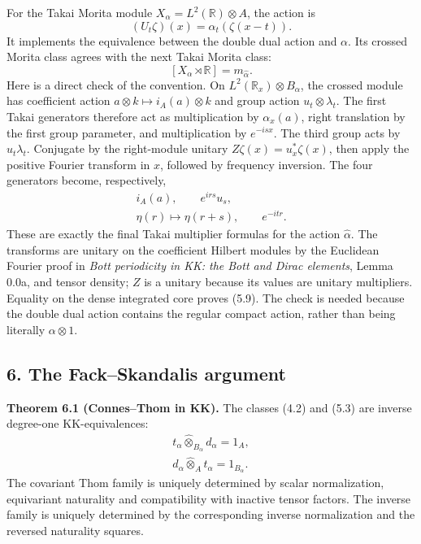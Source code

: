 \documentclass[
  11pt,
]{article}
\begin{document}
For the Takai Morita module \(X_\alpha=L^2(\mathbb R)\otimes A\), the
action is \[
(U_t\zeta)(x)=\alpha_t(\zeta(x-t)).
\tag{5.8}
\] It implements the equivalence between the double dual action and
\(\alpha\). Its crossed Morita class agrees with the next Takai Morita
class: \[
[X_\alpha\rtimes\mathbb R]=m_{\widehat\alpha}.
\tag{5.9}
\] Here is a direct check of the convention. On
\(L^2(\mathbb R_x)\otimes B_\alpha\), the crossed module has coefficient
action \(a\otimes k\mapsto i_A(a)\otimes k\) and group action
\(u_t\otimes\lambda_t\). The first Takai generators therefore act as
multiplication by \(\alpha_x(a)\), right translation by the first group
parameter, and multiplication by \(e^{-isx}\). The third group acts by
\(u_t\lambda_t\). Conjugate by the right-module unitary
\(Z\zeta(x)=u_x^*\zeta(x)\), then apply the positive Fourier transform
in \(x\), followed by frequency inversion. The four generators become,
respectively, \[
\begin{gathered}
i_A(a),\qquad e^{irs}u_s,\\
\eta(r)\longmapsto\eta(r+s),\qquad e^{-itr}.
\end{gathered}
\tag{5.10}
\] These are exactly the final Takai multiplier formulas for the action
\(\widehat\alpha\). The transforms are unitary on the coefficient
Hilbert modules by the Euclidean Fourier proof in \emph{Bott periodicity
in KK: the Bott and Dirac elements}, Lemma 0.0a, and tensor density;
\(Z\) is a unitary because its values are unitary multipliers. Equality
on the dense integrated core proves (5.9). The check is needed because
the double dual action contains the regular compact action, rather than
being literally \(\alpha\otimes1\).

\subsection{6. The Fack--Skandalis
argument}\label{the-fackskandalis-argument}

\textbf{Theorem 6.1 (Connes--Thom in KK).} The classes (4.2) and (5.3)
are inverse degree-one KK-equivalences: \[
\begin{gathered}
t_\alpha\widehat\otimes_{B_\alpha}d_\alpha=1_A,\\
d_\alpha\widehat\otimes_At_\alpha=1_{B_\alpha}.
\end{gathered}
\tag{6.1}
\] The covariant Thom family is uniquely determined by scalar
normalization, equivariant naturality and compatibility with inactive
tensor factors. The inverse family is uniquely determined by the
corresponding inverse normalization and the reversed naturality squares.
\end{document}
